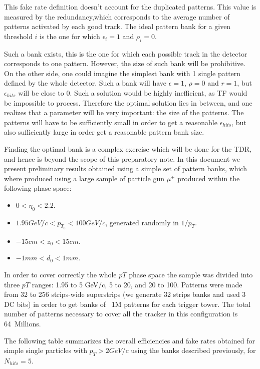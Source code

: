\noindent This fake rate definition doesn't account for the duplicated patterns. This value is measured by the redundancy,which corresponds to the average number of patterns activated by each good track. The ideal pattern bank for a given threshold $i$ is the one for which $\epsilon_i = 1$ and $\rho_i = 0$.

\noindent Such a bank exists, this is the one for which each possible track in the detector corresponds to one pattern. However, the size of such bank will be prohibitive. On the other side, one could imagine the simplest bank with 1 single pattern defined by the whole detector. Such a bank will have $\epsilon=1$, $\rho = 0$ and $r = 1$, but $\epsilon_{hits}$ will be close to 0. Such a solution would be highly inefficient, as TF would be impossible to process. Therefore the optimal solution lies in between, and one realizes that a parameter will be very important: the size of the patterns. The patterns will have to be sufficiently small in order to get a reasonable $\epsilon_{hits}$, but also sufficiently large in order get a reasonable pattern bank size. 

\noindent Finding the optimal bank is a complex exercise which will be done for the TDR, and hence is beyond the scope of this preparatory note. In this document we present preliminary results obtained using a simple set of pattern banks, which where produced using a large sample of particle gun $\mu^{\pm}$ produced within the following phase space:
\begin{itemize}
\item $0 < \eta_0 < 2.2$.
\item $1.95GeV/c < p_{T_0} < 100GeV/c$, generated randomly in $1/p_T$.
\item $-15cm < z_0 < 15cm$.
 \item $-1mm < d_0 < 1mm$.
\end{itemize}  

\noindent In order to cover correctly the whole $pT$ phase space the sample was divided into three $pT$ ranges: 1.95 to 5 GeV/c, 5 to 20, and 20 to 100. Patterns were made from 32 to 256 strips-wide superstrips (we generate 32 strips banks and used 3 DC bits) in order to get banks of ~1M patterns for each trigger tower. The total number of patterns necessary to cover all the tracker in this configuration is 64~Millions. 

\noindent The following table summarizes the overall efficiencies and fake rates obtained for simple single particles with $p_T>2GeV/c$ using the banks described previously, for $N_{hits}=5$.

